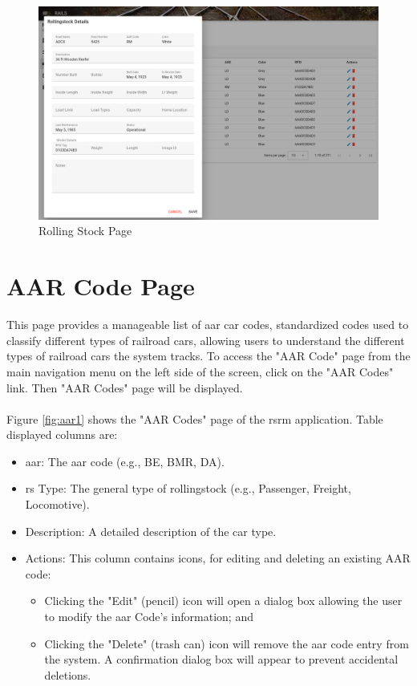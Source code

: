 \begin{figure}[H]
    \centering
    \includegraphics[scale=0.33]{./images/rs-edit.png}
    \caption{Rolling Stock Page}
    \label{fig:rollingstock3}
\end{figure}

\section{AAR Code Page}
This page provides a manageable list of \gls{aar} car codes, standardized codes used to classify different types of railroad cars, allowing users to understand 
the different types of railroad cars the system tracks. To access the "AAR Code" page from the main navigation menu on the left side of the screen, click on 
the "AAR Codes" link. Then "AAR Codes" page will be displayed.\vspace{5mm} \\
\\
Figure \ref{fig:aar1} shows the "AAR Codes" page of the \gls{rsrm} application. Table displayed columns are:
\begin{itemize}
    \item \gls{aar}: The \gls{aar} code (e.g., BE, BMR, DA).
    \item \gls{rs} Type: The general type of rollingstock (e.g., Passenger, Freight, Locomotive).
    \item Description: A detailed description of the car type.
    \item Actions: This column contains icons, for editing and deleting an existing AAR code:
    \begin{itemize}
        \item Clicking the "Edit" (pencil) icon will open a dialog box allowing the user to modify the \gls{aar} Code's information; and
        \item Clicking the "Delete" (trash can) icon will remove the \gls{aar} code entry from the system. A confirmation dialog box will 
        appear to prevent accidental deletions.
    \end{itemize}
\end{itemize}

